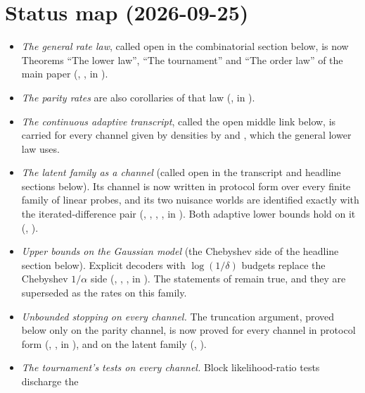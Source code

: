 \section*{Status map (2026-09-25)}
\begin{itemize}
\item \emph{The general rate law}, called open in the combinatorial section below, is now
Theorems ``The lower law'', ``The tournament'' and ``The order law'' of the main paper
(, ,  in
).
\item \emph{The parity rates} are also corollaries of that law
(,  in
).
\item \emph{The continuous adaptive transcript}, called the open middle link below, is carried
for every channel given by densities by  and
, which the general lower law uses.
\item \emph{The latent family as a channel} (called open in the transcript and headline sections below). Its channel is now
written in protocol form over every finite family of linear probes, and its two nuisance worlds
are identified exactly with the iterated-difference pair (, ,
, ,  in
). Both adaptive lower bounds hold on it
(, ).
\item \emph{Upper bounds on the Gaussian model} (the Chebyshev side of the headline section below). Explicit decoders with
$\log(1/\delta)$ budgets replace the Chebyshev $1/\alpha$ side (,
, ,  in
). The statements of  remain true,
and they are superseded as the rates on this family.
\item \emph{Unbounded stopping on every channel.} The truncation argument, proved below only
on the parity channel, is now proved for every channel in protocol form
(, , 
in ), and on the latent family
(, ).
\item \emph{The tournament's tests on every channel.} Block likelihood-ratio tests discharge the

\end{itemize}
